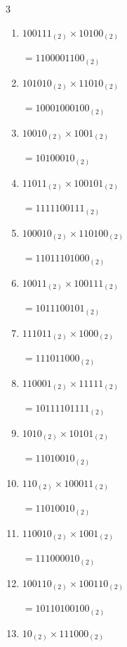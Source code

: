\begin{multicols}{3}
\begin{enumerate}
        $=101101010010_{(2)}$

  \item $100111_{(2)} \times 10100_{(2)}$

        $=1100001100_{(2)}$

  \item $101010_{(2)} \times 11010_{(2)}$

        $=10001000100_{(2)}$

  \item $10010_{(2)} \times 1001_{(2)}$

        $=10100010_{(2)}$

  \item $11011_{(2)} \times 100101_{(2)}$

        $=1111100111_{(2)}$

\columnbreak %

  \item $100010_{(2)} \times 110100_{(2)}$

        $=11011101000_{(2)}$

  \item $10011_{(2)} \times 100111_{(2)}$

        $=1011100101_{(2)}$

  \item $111011_{(2)} \times 1000_{(2)}$

        $=111011000_{(2)}$

  \item $110001_{(2)} \times 11111_{(2)}$

        $=10111101111_{(2)}$

  \item $1010_{(2)} \times 10101_{(2)}$

        $=11010010_{(2)}$

\columnbreak %

\resetques

  \item $110_{(2)} \times 100011_{(2)}$

        $=11010010_{(2)}$

  \item $110010_{(2)} \times 1001_{(2)}$

        $=111000010_{(2)}$

  \item $100110_{(2)} \times 100110_{(2)}$

        $=10110100100_{(2)}$

  \item $10_{(2)} \times 111000_{(2)}$


\end{enumerate}
\end{multicols}
